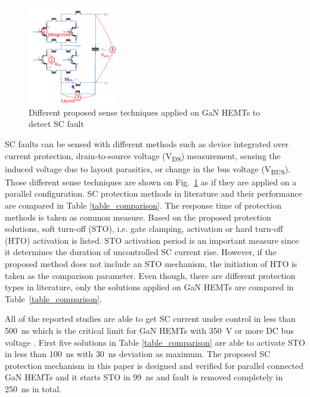 \documentclass[journal]{IEEEtran}
\begin{document}
\begin{figure}[]
\centering
\includegraphics[width=0.35\textwidth]{Figures/Fig18-SenseOptions - v2.pdf}
\caption{Different proposed sense techniques applied on GaN HEMTs to detect SC fault}
\label{fig_senseopt}
\end{figure}


SC faults can be sensed with different methods such as device integrated over current protection, drain-to-source voltage (V\textsubscript{DS}) measurement, sensing the induced voltage due to layout parasitics, or change in the bus voltage (V\textsubscript{BUS}). Those different sense techniques are shown on Fig.~\ref{fig_senseopt} as if they are applied on a parallel configuration. SC protection methods in literature and their performance are compared in Table \ref{table_comparison}. The response time of protection methods is taken as common measure. Based on the proposed protection solutions, soft turn-off (STO), i.e. gate clamping, activation or hard turn-off (HTO) activation is listed. STO activation period is an important measure since it determines the duration of uncontrolled SC current rise. However, if the proposed method does not include an STO mechanism, the initiation of HTO is taken as the comparison parameter. Even though, there are different protection types in literature, only the solutions applied on GaN HEMTs are compared in Table~\ref{table_comparison}.

All of the reported studies are able to get SC current under control in less than 500~ns which is the critical limit for GaN HEMTs with 350~V or more DC bus voltage \cite{Lyu2020}. First five solutions in Table \ref{table_comparison} are able to activate STO in less than 100~ns with 30~ns deviation as maximum. The proposed SC protection mechanism in this paper is designed and verified for parallel connected GaN HEMTs and it starts STO in 99~ns and fault is removed completely in 250~ns in total.
\end{document}
